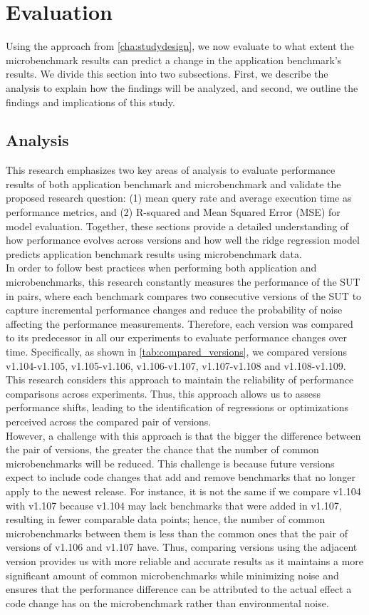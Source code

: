 \section{Evaluation}
Using the approach from \cref{cha:studydesign}, we now evaluate to what extent the microbenchmark results can predict a change in the application benchmark's results. We divide this section into two subsections. First, we describe the analysis to explain how the findings will be analyzed, and second, we outline the findings and implications of this study. 
\label{cha:evaluation}
\subsection{Analysis}
This research emphasizes two key areas of analysis to evaluate performance results of both application benchmark and microbenchmark and validate the proposed research question: (1) mean query rate and average execution time as performance metrics, and (2) R-squared and Mean Squared Error (\ac{MSE}) for model evaluation. Together, these sections provide a detailed understanding of how performance evolves across versions and how well the ridge regression model predicts application benchmark results using microbenchmark data.  \\
In order to follow best practices when performing both application and microbenchmarks, this research constantly measures the performance of the \ac{SUT} in pairs, where each benchmark compares two consecutive versions of the \ac{SUT} to capture incremental performance changes and reduce the probability of noise affecting the performance measurements. Therefore, each version was compared to its predecessor in all our experiments to evaluate performance changes over time. Specifically, as shown in \cref{tab:compared_versions}, we compared versions v1.104-v1.105, v1.105-v1.106, v1.106-v1.107, v1.107-v1.108 and v1.108-v1.109. This research considers this approach to maintain the reliability of performance comparisons across experiments. Thus, this approach allows us to assess performance shifts, leading to the identification of regressions or optimizations perceived across the compared pair of versions. \\
However, a challenge with this approach is that the bigger the difference between the pair of versions, the greater the chance that the number of common microbenchmarks will be reduced. This challenge is because future versions expect to include code changes that add and remove benchmarks that no longer apply to the newest release. For instance, it is not the same if we compare v1.104 with v1.107 because v1.104 may lack benchmarks that were added in v1.107, resulting in fewer comparable data points; hence, the number of common microbenchmarks between them is less than the common ones that the pair of versions of v1.106 and v1.107 have. Thus, comparing versions using the adjacent version provides us with more reliable and accurate results as it maintains a more significant amount of common microbenchmarks while minimizing noise and ensures that the performance difference can be attributed to the actual effect a code change has on the microbenchmark rather than environmental noise. 
